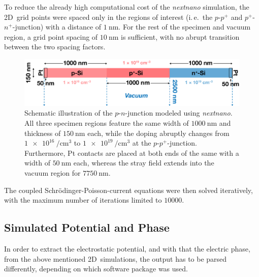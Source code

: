 To reduce the already high computational cost of the \emph{nextnano} simulation, the 2D~grid points were spaced only in the regions of interest (i.\,e.\ the $p$-$p^+$ and $p^+$-$n^+$-junction) with a distance of $\SI{1}{\nm}$. For the rest of the specimen and vacuum region, a grid point spacing of $\SI{10}{\nm}$ is sufficient, with no abrupt transition between the two spacing factors.
\begin{figure}[H]
	\centering
	\includegraphics[width=\textwidth]{Figures/Specimen/pn-Junction/specimen-nextnano-layout.pdf}
	\caption{Schematic illustration of the $p$-$n$-junction modeled using \emph{nextnano}. All three specimen regions feature the same width of $\SI{1000}{\nm}$ and thickness of $\SI{150}{\nm}$ each, while the doping abruptly changes from $\SI[per-mode=power]{1e16}{\per\cubic\cm}$ to $\SI[per-mode=power]{1e19}{\per\cubic\cm}$ at the $p$-$p^+$-junction. Furthermore, Pt contacts are placed at both ends of the same with a width of $\SI{50}{\nm}$ each, whereas the stray field extends into the vacuum region for $\SI{7750}{\nm}$.}
	\label{fig:specimen-nextnano-layout}
\end{figure}
The coupled Schrödinger-Poisson-current equations were then solved iteratively, with the maximum number of iterations limited to $\num{10000}$.
\subsection{Simulated Potential and Phase} \label{ssec:FEM-simulated-potential-and-phase}
In order to extract the electrostatic potential, and with that the electric phase, from the above mentioned 2D~simulations, the output has to be parsed differently, depending on which software package was used.

